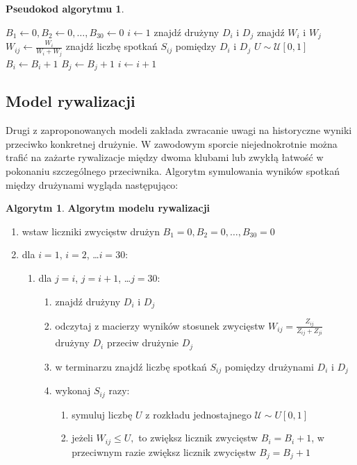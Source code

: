 \documentclass[inzynierska]{pwr_wmat_praca_dyplomowa}
\theoremstyle{plain}
\numberwithin{theorem}{chapter}
\theoremstyle{definition}
\numberwithin{theorem}{chapter}
\newtheorem{algorytm}[theorem]{Algorytm}
\newtheorem{pseudokod}[theorem]{Pseudokod algorytmu}
\begin{document}
\begin{pseudokod}
	\begin{algorithmic}[1]
		\State $B_1\gets 0,B_2\gets 0,\dots, B_{30}\gets 0$
		\State $i\gets 1$
		\State znajdź drużyny $D_i$ i $D_j$
		\State znajdź $W_i$ i $W_j$ 
		\State $W_{ij}\gets\frac{W_i}{W_i + W_j}$
		\State znajdź liczbę spotkań $S_{ij}$ pomiędzy $D_i$ i $D_j$
		\State $U\sim \mathcal{U}[0,1]$
		\State $B_i \gets B_i+1$
		\Else
		\State $B_j \gets B_j+1$
		\EndIf
		\EndFor
		\EndFor
		\State $i\gets i+1$
		\EndWhile
	\end{algorithmic}
\end{pseudokod}

\subsection{Model rywalizacji}
Drugi z zaproponowanych modeli zakłada zwracanie uwagi na historyczne wyniki przeciwko konkretnej drużynie. W zawodowym sporcie niejednokrotnie można trafić na zażarte rywalizacje między dwoma klubami lub zwykłą łatwość w pokonaniu szczególnego przeciwnika. Algorytm symulowania wyników spotkań między drużynami wygląda następująco:

\begin{algorytm} \textbf{Algorytm modelu rywalizacji}
	\begin{enumerate}
		\item wstaw liczniki zwycięstw drużyn $B_1= 0,B_2= 0,\dots, B_{30}= 0$
		\item dla $i=1$, $i=2$, \dots $i=30$: 
		\begin{enumerate}
			\item dla $j=i$, $j=i+1$, \dots $j=30$: 
			\begin{enumerate}
				\item znajdź drużyny $D_i$ i $D_j$
				\item odczytaj z macierzy wyników stosunek zwycięstw $W_{ij}=\frac{Z_{ij}}{Z_{ij}+Z_{ji}}$ drużyny $D_i$ przeciw drużynie $D_j$   
				\item w terminarzu znajdź liczbę spotkań $S_{ij}$ pomiędzy drużynami $D_i$ i $D_j$
				\item wykonaj $S_{ij}$ razy:
				\begin{enumerate}
					\item symuluj liczbę $U$ z rozkładu jednostajnego $\mathcal{U}\sim U[0,1]$ 
					\item jeżeli $W_{ij} \leq U,$ to zwiększ licznik zwycięstw $B_i=B_i+1$, w przeciwnym razie zwiększ licznik zwycięstw $B_j=B_j+1$
				\end{enumerate}
			\end{enumerate}
		\end{enumerate}
	\end{enumerate}
\end{algorytm} 
\end{document}
